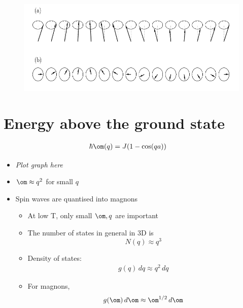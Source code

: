 \documentclass[a4paper, 11pt, normalem]{report}
\begin{document}
\begin{itemize}
        \begin{figure}[H]
            \centering
            \includegraphics[scale=0.5]{spinrot.png}
        \end{figure}
\end{itemize}

\section{Energy above the ground state}
\begin{align}
    \hbar\om(q) &= J(1-\cos(qa))
\end{align}
\begin{itemize}
    \item \emph{Plot graph here}
    \item $\om \approx q^2$ for small $q$
    \item Spin waves are quantised into magnons
        \begin{itemize}
            \item At low T, only small $\om,q$ are important
            \item The number of states in general in 3D is 
                \begin{equation}
                    N(q) \approx q^3
                \end{equation}
            \item Density of states:
                \begin{align}
                    g(q)\,dq \approx q^2\,dq
                \end{align}
            \item For magnons, 
                \begin{equation}
                    g(\om)\,d\om \approx \om^{1/2}\,d\om
                \end{equation}
        \end{itemize}
\end{itemize}
\end{document}
